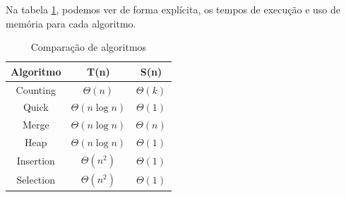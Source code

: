 Na tabela \ref{cap:2:table:all}, podemos ver de forma explícita, os tempos de execução e
uso de memória para cada algoritmo.

\begin{table}[h]
    \centering
    \caption{Comparação de algoritmos}
    \label{cap:2:table:all}
    \begin{tabular}{|c|c|c|}
    \hline
    \textbf{Algoritmo} & \textbf{T(n)} & \textbf{S(n)} \\ \hline
    Counting   & $\Theta(n)$    & $\Theta(k)$    \\ \hline
    Quick      & $\Theta(n \log n)$ & $\Theta(1)$   \\ \hline
    Merge      & $\Theta(n \log n)$ & $\Theta(n)$    \\ \hline
    Heap       & $\Theta(n \log n)$ & $\Theta(1)$    \\ \hline
    Insertion  & $\Theta(n^2)$      & $\Theta(1)$    \\ \hline
    Selection  & $\Theta(n^2)$      & $\Theta(1)$    \\ \hline
    \end{tabular}
\end{table}
    


